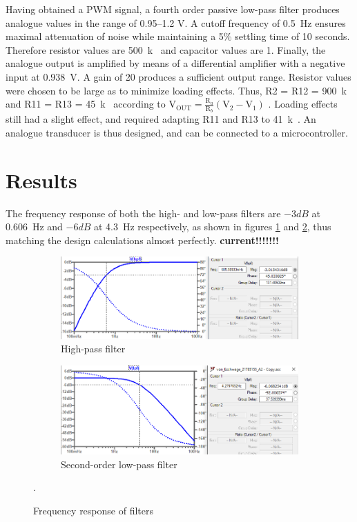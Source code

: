 Having obtained a PWM signal, a fourth order passive low-pass filter produces analogue values in the range of \numrange{0.95}{1.2} \si{V}. A cutoff frequency of \SI{0.5}{Hz} ensures maximal attenuation of noise while maintaining a 5\% settling time of 10 seconds. Therefore resistor values are \SI{500}{k\Omega} and capacitor values are \SI{1}{\mu}. Finally, the analogue output is amplified by means of a differential amplifier with a negative input at \SI{0.938}{V}. A gain of 20 produces a sufficient output range. Resistor values were chosen to be large as to minimize loading effects. Thus, R2 = R12 = \SI{900}{k\Omega} and R11 = R13 = \SI{45}{k\Omega} according to $\mathrm{V}_{\mathrm{OUT}}=\frac{\mathrm{R}_{a}}{\mathrm{R}_{b}}\left(\mathrm{V}_{2}-\mathrm{V}_{1}\right)$ \cite{opamp}. Loading effects still had a slight effect, and required adapting R11 and R13 to \SI{41}{k\Omega}. An analogue transducer is thus designed, and can be connected to a microcontroller.

\section{Results} \label{sec:heartResults}
The frequency response of both the high- and low-pass filters are $-3dB$ at \SI{0.606}{Hz} and $-6dB$ at \SI{4.3}{Hz} respectively, as shown in figures \ref{subfig:hpf} and \ref{subfig:lpf1}, thus matching the design calculations almost perfectly. \textbf{current!!!!!!!}
\begin{figure}
 \footnotesize
   \centering
   \begin{subfigure}[]{0.48\textwidth}
        \includegraphics[width=\linewidth]{./Figures/hpf}
	  \caption{High-pass filter} \label{subfig:hpf}	
   \end{subfigure}
   \begin{subfigure}[]{0.48\textwidth}
  	 \includegraphics[width=\linewidth]{./Figures/lpf1}
	  \caption{Second-order low-pass filter} \label{subfig:lpf1}	
   \end{subfigure}
      
   \caption {Frequency response of filters}.
   \label{fig:freqreq}
 \end{figure}


